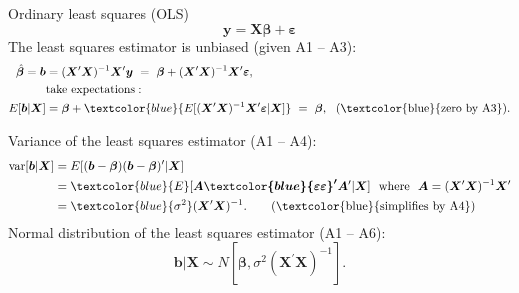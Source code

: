 \documentclass{beamer}
\begin{document}
\begin{frame}{Ordinary least squares (OLS)}
\vspace{-0.3cm}
$$
\bm{y} = \bm{X\beta} + \bm{\varepsilon}
$$
\medskip
The least squares estimator is unbiased (given A1 -- A3):
\begin{align*}
    \hat{\bm{\beta}}=\bm{b}&=(\bm{X}^{\prime}\bm{X})^{-1} \bm{X}^{\prime}\bm{y}~=~\bm{\beta}+(\bm{X}^{\prime}\bm{X})^{-1} \bm{X}^{\prime}\bm{\varepsilon}, \\
    &\textnormal{take expectations}:\\
    E[\bm{b}|\bm{X}]&= \bm{\beta}+\textcolor{blue}{E[(\bm{X}^{\prime}\bm{X})^{-1} \bm{X}^{\prime}\bm{\varepsilon}|\bm{X}]}~=~\bm{\beta}, ~~(\textnormal{\textcolor{blue}{zero by A3}}).\\
\end{align*}

Variance of the least squares estimator (A1 -- A4):
\begin{align*}
    \textnormal{var}[\bm{b}|\bm{X}]&=E[(\bm{b}-\bm{\beta})(\bm{b}-\bm{\beta})^{\prime}|\bm{X}]\\
    &=\textcolor{blue}{E}[\bm{A \textcolor{blue}{\varepsilon \varepsilon}^{\prime}}\bm{A}^{\prime}|\bm{X}] \textnormal{~~where~~}\bm{A}=(\bm{X}^{\prime}\bm{X})^{-1} \bm{X}^{\prime}\\
    &= \textcolor{blue}{\sigma^2} (\bm{X}^{\prime}\bm{X})^{-1}. ~~~~~~\textnormal{(\textcolor{blue}{simplifies by A4})}\\
\end{align*}
Normal distribution of the least squares estimator (A1 -- A6):
$$\bm{b} | \bm{X} \sim N[\bm{\beta}, \sigma^2(\bm{X}^{\prime}\bm{X})^{-1}].$$
\end{frame}
\end{document}
